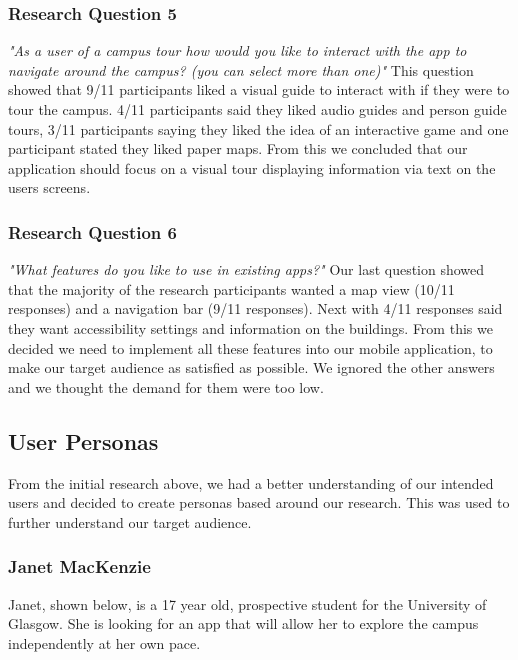 \documentclass[a4,10pt,twocolumn]{article}
\begin{document}
\subsubsection{Research Question 5}
\noindent\emph{"As a user of a campus tour how would you like to interact with the app to navigate around the campus? (you can select more than one)"}
\newline
\newline
This question showed that 9/11 participants liked a visual guide to interact with if they were to tour the campus. 4/11 participants said they liked audio guides and person guide tours, 3/11 participants saying they liked the idea of an interactive game and one participant stated they liked paper maps. From this we concluded that our application should focus on a visual tour displaying information via text on the users screens. 

\subsubsection{Research Question 6}
\label{bit:navbar}
\noindent\emph{"What features do you like to use in existing apps?"}
\newline
\newline
Our last question showed that the majority of the research participants wanted a map view (10/11 responses) and a navigation bar (9/11 responses). Next with 4/11 responses said they want accessibility settings and information on the buildings. From this we decided we need to implement  all these features into our mobile application, to make our target audience as satisfied as possible. We ignored the other answers and we thought the demand for them were too low.

\subsection{User Personas}
From the initial research above, we had a better understanding of our intended users and decided to create personas based around our research. This was used to further understand our target audience.

\subsubsection{Janet MacKenzie}
Janet, shown below, is a 17 year old, prospective student for the University of Glasgow. She is looking for an app that will allow her to explore the campus independently at her own pace.
\end{document}
